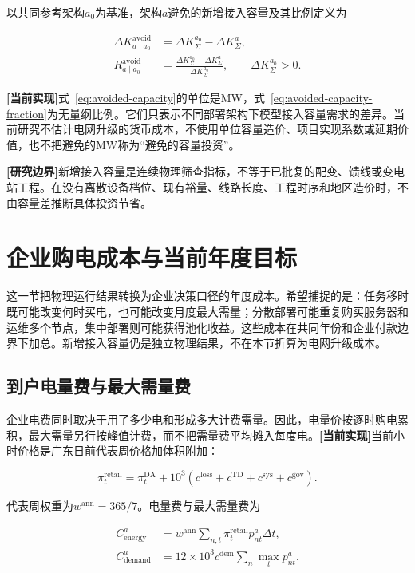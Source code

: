 \documentclass[preprint]{elsarticle}
\newcommand{\implemented}{\textcolor{green!40!black}{\textbf{[当前实现]}}}
\newcommand{\boundary}{\textcolor{black!65}{\textbf{[研究边界]}}}
\begin{document}
以共同参考架构$a_0$为基准，架构$a$避免的新增接入容量及其比例定义为

\begin{align}
 \Delta K^{\mathrm{avoid}}_{a\mid a_0}
 &=\Delta K^{a_0}_{\Sigma}-\Delta K^a_{\Sigma},
 \label{eq:avoided-capacity}\\
 R^{\mathrm{avoid}}_{a\mid a_0}
 &=\frac{\Delta K^{a_0}_{\Sigma}-\Delta K^a_{\Sigma}}
 {\Delta K^{a_0}_{\Sigma}},
 \qquad \Delta K^{a_0}_{\Sigma}>0.
 \label{eq:avoided-capacity-fraction}
\end{align}

\implemented 式~\eqref{eq:avoided-capacity}的单位是MW，式~\eqref{eq:avoided-capacity-fraction}为无量纲比例。它们只表示不同部署架构下模型接入容量需求的差异。当前研究不估计电网升级的货币成本，不使用单位容量造价、项目实现系数或延期价值，也不把避免的MW称为“避免的容量投资”。

\boundary 新增接入容量是连续物理筛查指标，不等于已批复的配变、馈线或变电站工程。在没有离散设备档位、现有裕量、线路长度、工程时序和地区造价时，不由容量差推断具体投资节省。

\section{企业购电成本与当前年度目标}

这一节把物理运行结果转换为企业决策口径的年度成本。希望捕捉的是：任务移时既可能改变何时买电，也可能改变月度最大需量；分散部署可能重复购买服务器和运维多个节点，集中部署则可能获得池化收益。这些成本在共同年份和企业付款边界下加总。新增接入容量仍是独立物理结果，不在本节折算为电网升级成本。

\subsection{到户电量费与最大需量费}

企业电费同时取决于用了多少电和形成多大计费需量。因此，电量价按逐时购电累积，最大需量另行按峰值计费，而不把需量费平均摊入每度电。\implemented 当前小时价格是广东日前代表周价格加体积附加：

\begin{equation}
 \pi_t^{\mathrm{retail}}
 =\pi_t^{\mathrm{DA}}+10^3
 (c^{\mathrm{loss}}+c^{\mathrm{TD}}+c^{\mathrm{sys}}+c^{\mathrm{gov}}).
 \label{eq:retail-price}
\end{equation}

代表周权重为$w^{\mathrm{ann}}=365/7$。电量费与最大需量费为

\begin{align}
 C^a_{\mathrm{energy}}
 &=w^{\mathrm{ann}}\sum_{n,t}\pi_t^{\mathrm{retail}}p^a_{nt}\Delta t,
 \label{eq:energy-cost}\\
 C^a_{\mathrm{demand}}
 &=12\times10^3c^{\mathrm{dem}}\sum_n\max_tp^a_{nt}.
 \label{eq:demand-cost}
\end{align}
\end{document}

